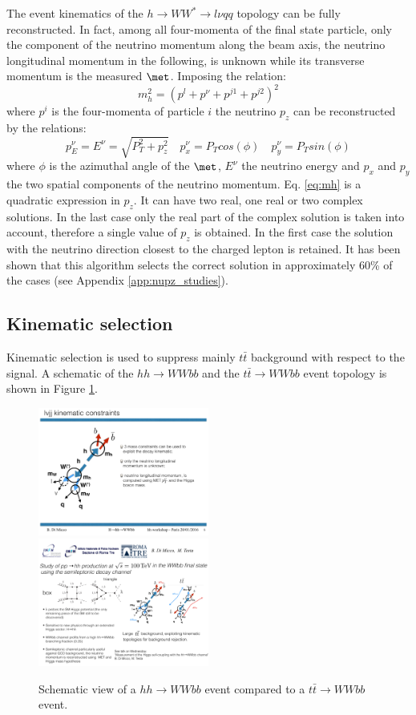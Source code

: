The event kinematics of the $h \to WW^* \to l \nu qq$ topology can be fully
reconstructed. In fact, among all four-momenta of the final state particle,
only the component of the neutrino momentum along the beam axis, the neutrino
longitudinal momentum in the following, is unknown while its transverse
momentum is the measured $\met$. Imposing the relation:
\begin{equation}
\label{eq:mh}
m_h^2 = (p^l + p^{\nu} + p^{j1} + p^{j2})^2
\end{equation}
where $p^i$ is the four-momenta of particle $i$ the neutrino $p_z$ can be
reconstructed by the relations:
\[
p_E^{\nu} = E^{\nu} = \sqrt{P_T^2 + p_z^2} \quad p_x^{\nu} = P_Tcos(\phi) \quad p_y^{\nu} = P_T sin(\phi)
\]
where $\phi$ is the azimuthal angle of the $\met$, $E^{\nu}$ the neutrino
energy and $p_x$ and $p_y$ the two spatial components of the neutrino momentum.
Eq. \ref{eq:mh} is a quadratic expression in $p_z$. It can have two real,
one real  or two complex solutions. In the last case only the real part of the
complex solution is taken into account, therefore a single value of $p_z$ is
obtained. In the first case the solution with the neutrino direction closest
to the charged lepton is retained. It has been shown that this algorithm
selects the correct solution in approximately 60\% of the cases
(see Appendix \ref{app:nupz_studies}).


\subsection{Kinematic selection}
\label{subsec:kincuts}


Kinematic selection is used to suppress mainly $t\bar{t}$ background with
respect to the signal.  A schematic of the $hh \to WWbb$ and the
$t \bar{t} \to WWbb$ event topology is shown in Figure \ref{fig:cartoon}.
\begin{figure}
\includegraphics[width=0.5\textwidth]{chapters/dihiggs/figures/cartoon_hh.pdf}
\includegraphics[width=0.5\textwidth]{chapters/dihiggs/figures/cartoon_tt.pdf}
\caption{Schematic view of a $hh \to WWbb$ event compared to a $t\bar{t} \to WWbb$ event.} 
\label{fig:cartoon}
\end{figure}

